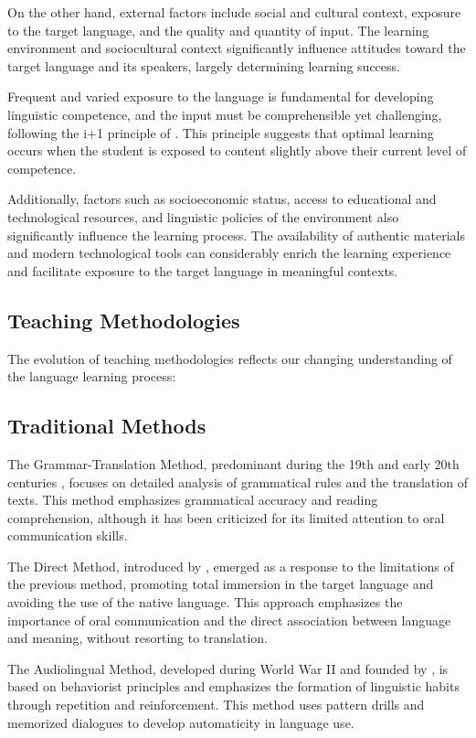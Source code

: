 On the other hand, external factors include social and cultural context, exposure to the target language, and the quality and quantity of input. The learning environment and sociocultural context significantly influence attitudes toward the target language and its speakers, largely determining learning success.

Frequent and varied exposure to the language is fundamental for developing linguistic competence, and the input must be comprehensible yet challenging, following the i+1 principle of \cite{krashen1982principles}. This principle suggests that optimal learning occurs when the student is exposed to content slightly above their current level of competence.

Additionally, factors such as socioeconomic status, access to educational and technological resources, and linguistic policies of the environment also significantly influence the learning process. The availability of authentic materials and modern technological tools can considerably enrich the learning experience and facilitate exposure to the target language in meaningful contexts.

\subsection{Teaching Methodologies}
The evolution of teaching methodologies reflects our changing understanding of the language learning process:

\subsection{Traditional Methods}

The Grammar-Translation Method, predominant during the 19th and early 20th centuries \cite{richards2000approaches}, focuses on detailed analysis of grammatical rules and the translation of texts. This method emphasizes grammatical accuracy and reading comprehension, although it has been criticized for its limited attention to oral communication skills.

The Direct Method, introduced by \cite{gouin1892art}, emerged as a response to the limitations of the previous method, promoting total immersion in the target language and avoiding the use of the native language. This approach emphasizes the importance of oral communication and the direct association between language and meaning, without resorting to translation.

The Audiolingual Method, developed during World War II and founded by \cite{fries1945teaching}, is based on behaviorist principles and emphasizes the formation of linguistic habits through repetition and reinforcement. This method uses pattern drills and memorized dialogues to develop automaticity in language use.


